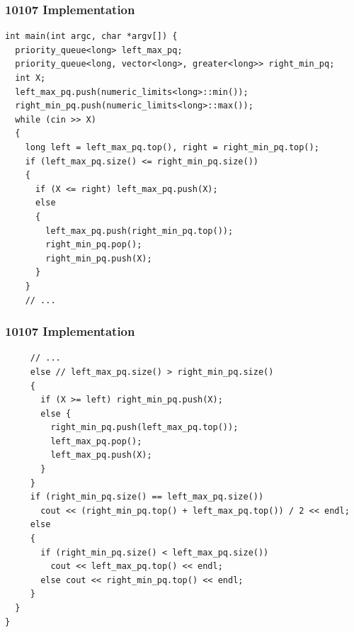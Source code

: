 \documentclass{beamer}
\begin{document}
\begin{frame}[containsverbatim]
\frametitle{10107 Implementation}
\scriptsize
\begin{lstlisting}
int main(int argc, char *argv[]) {
  priority_queue<long> left_max_pq;
  priority_queue<long, vector<long>, greater<long>> right_min_pq;
  int X;
  left_max_pq.push(numeric_limits<long>::min());
  right_min_pq.push(numeric_limits<long>::max());
  while (cin >> X)
  {
    long left = left_max_pq.top(), right = right_min_pq.top();
    if (left_max_pq.size() <= right_min_pq.size())
    {
      if (X <= right) left_max_pq.push(X);
      else
      {
        left_max_pq.push(right_min_pq.top());
        right_min_pq.pop();
        right_min_pq.push(X);
      }
    }
    // ...
\end{lstlisting}

\end{frame}

\begin{frame}[containsverbatim]
\frametitle{10107 Implementation}
\scriptsize
\begin{lstlisting}
     // ...
     else // left_max_pq.size() > right_min_pq.size()
     {
       if (X >= left) right_min_pq.push(X);
       else {
         right_min_pq.push(left_max_pq.top());
         left_max_pq.pop();
         left_max_pq.push(X);
       }
     }
     if (right_min_pq.size() == left_max_pq.size())
       cout << (right_min_pq.top() + left_max_pq.top()) / 2 << endl;
     else
     {
       if (right_min_pq.size() < left_max_pq.size())
         cout << left_max_pq.top() << endl;
       else cout << right_min_pq.top() << endl;
     }
  }
}
\end{lstlisting}

\end{frame}
\end{document}
